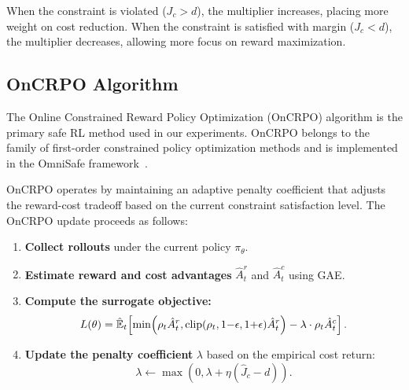 When the constraint is violated ($J_c > d$), the multiplier increases, placing more weight on cost reduction. When the constraint is satisfied with margin ($J_c < d$), the multiplier decreases, allowing more focus on reward maximization.

\subsection{OnCRPO Algorithm}

The Online Constrained Reward Policy Optimization (OnCRPO) algorithm is the primary safe RL method used in our experiments. OnCRPO belongs to the family of first-order constrained policy optimization methods and is implemented in the OmniSafe framework~\citep{ji2023omnisafe}.

OnCRPO operates by maintaining an adaptive penalty coefficient that adjusts the reward-cost tradeoff based on the current constraint satisfaction level. The OnCRPO update proceeds as follows:

\begin{enumerate}
    \item \textbf{Collect rollouts} under the current policy $\pi_\theta$.
    \item \textbf{Estimate reward and cost advantages} $\hat{A}_t^r$ and $\hat{A}_t^c$ using GAE.
    \item \textbf{Compute the surrogate objective:}
    \begin{equation}
        L(\theta) = \hat{\mathbb{E}}_t\!\left[\min\!\left(\rho_t \hat{A}_t^r, \operatorname{clip}(\rho_t, 1{-}\epsilon, 1{+}\epsilon) \hat{A}_t^r\right) - \lambda \cdot \rho_t \hat{A}_t^c\right].
    \end{equation}
    \item \textbf{Update the penalty coefficient} $\lambda$ based on the empirical cost return:
    \begin{equation}
        \lambda \leftarrow \max\!\left(0, \lambda + \eta \left(\hat{J}_c - d\right)\right).
    \end{equation}
\end{enumerate}

